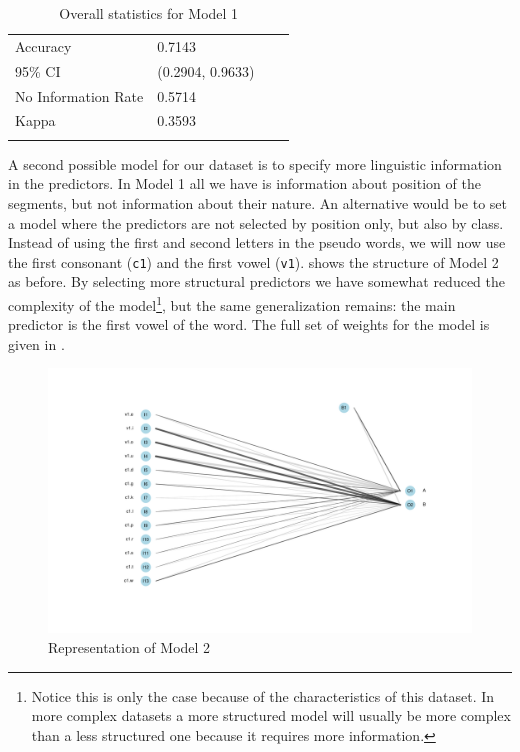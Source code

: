\begin{table}[!htpb]
  \centering
  \begin{tabular}{llrr}
    \lsptoprule
    \multicolumn{2}{c}{Overall statistics:} \\

    \midrule
    Accuracy            & 0.7143            \\
    95\% CI             & (0.2904, 0.9633)  \\
    No Information Rate & 0.5714            \\
    Kappa               & 0.3593            \\
    \lspbottomrule
  \end{tabular}
  \caption{Overall statistics for Model 1}\label{tab:stats-model1}
\end{table}

A second possible model for our dataset is to specify more linguistic information in the predictors. In Model 1 all we have is information about position of the segments, but not information about their nature. An alternative would be to set a model where the predictors are not selected by position only, but also by class. Instead of using the first and second letters in the pseudo words, we will now use the first consonant (\texttt{c1}) and the first vowel (\texttt{v1}).  shows the structure of Model 2 as before. By selecting more structural predictors we have somewhat reduced the complexity of the model\footnote{Notice this is only the case because of the characteristics of this dataset. In more complex datasets a more structured model will usually be more complex than a less structured one because it requires more information.}, but the same generalization remains: the main predictor is the first vowel of the word. The full set of weights for the model is given in .

\begin{figure}
  \includegraphics[scale=0.45]{./figures/fake/model2.pdf}
  \caption{Representation of Model 2}\label{fig:model2}
\end{figure}

